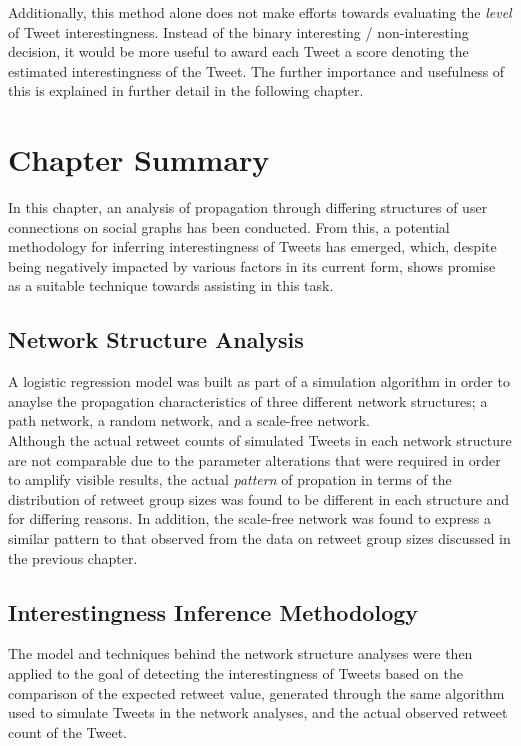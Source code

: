 Additionally, this method alone does not make efforts towards evaluating the \textit{level} of Tweet interestingness. Instead of the binary interesting / non-interesting decision, it would be more useful to award each Tweet a score denoting the estimated interestingness of the Tweet. The further importance and usefulness of this is explained in further detail in the following chapter.


\section{Chapter Summary}
In this chapter, an analysis of propagation through differing structures of user connections on social graphs has been conducted. From this, a potential methodology for inferring interestingness of Tweets has emerged, which, despite being negatively impacted by various factors in its current form, shows promise as a suitable technique towards assisting in this task.


\subsection{Network Structure Analysis}
A logistic regression model was built as part of a simulation algorithm in order to anaylse the propagation characteristics of three different network structures; a path network, a random network, and a scale-free network.\\
Although the actual retweet counts of simulated Tweets in each network structure are not comparable due to the parameter alterations that were required in order to amplify visible results, the actual \textit{pattern} of propation in terms of the distribution of retweet group sizes was found to be different in each structure and for differing reasons. In addition, the scale-free network was found to express a similar pattern to that observed from the data on retweet group sizes discussed in the previous chapter.


\subsection{Interestingness Inference Methodology}
The model and techniques behind the network structure analyses were then applied to the goal of detecting the interestingness of Tweets based on the comparison of the expected retweet value, generated through the same algorithm used to simulate Tweets in the network analyses, and the actual observed retweet count of the Tweet.

